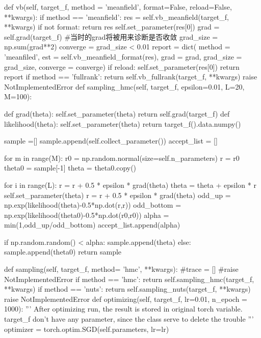 \documentclass{article}
\begin{document}
\begin{python}
    def vb(self, target_f, method = 'meanfield', format=False, 
                 reload=False, **kwargs):
        if method == 'meanfield':
            res = self.vb_meanfield(target_f, **kwargs)
            if not format:
                return res
            self.set_parameter(res[0])
            grad = self.grad(target_f) #当时的grad将被用来诊断是否收敛
            grad_size = np.sum(grad**2)
            converge = grad_size < 0.01
            report = dict( method = 'meanfiled', 
                           est = self.vb_meanfield_format(res),
                           grad = grad,
                           grad_size = grad_size,
                           converge = converge)
            if reload:
                self.set_parameter(res[0])
            return report
        if method == 'fullrank':
            return self.vb_fullrank(target_f, **kwargs)
        raise NotImplementedError
    def sampling_hmc(self, target_f, epsilon=0.01, L=20, M=100):
        
        def grad(theta):
            self.set_parameter(theta)
            return self.grad(target_f)
        def likelihood(theta):
            self.set_parameter(theta)
            return target_f().data.numpy()
        
        sample =[]
        sample.append(self.collect_parameter())
        accept_list = []
        
        for m in range(M):
            r0 = np.random.normal(size=self.n_parameters)
            r = r0
            theta0 = sample[-1]
            theta = theta0.copy()
            
            for i in range(L):
                r = r + 0.5 * epsilon * grad(theta)
                theta = theta + epsilon * r
                self.set_parameter(theta)
                r = r + 0.5 * epsilon * grad(theta)
            odd_up = np.exp(likelihood(theta)-0.5*np.dot(r,r))
            odd_bottom = np.exp(likelihood(theta0)-0.5*np.dot(r0,r0))
            alpha = min(1,odd_up/odd_bottom)
            accept_list.append(alpha)
            
            if np.random.random() < alpha:
                sample.append(theta)
            else:
                sample.append(theta0)
        return sample
        

    def sampling(self, target_f, method= 'hmc', **kwargs):
        #trace = []
        #raise NotImplementedError
        if method == 'hmc':
            return self.sampling_hmc(target_f, **kwargs)
        if method == 'nuts':
            return self.sampling_nuts(target_f, **kwargs)
        raise NotImplementedError
    def optimizing(self, target_f, lr=0.01, n_epoch = 1000):
        '''
        After optimizing run, the result is stored in original torch variable.
        target_f don't have any parameter, since the class serve to delete the trouble
        '''
        optimizer = torch.optim.SGD(self.parameters, lr=lr)
        

\end{python}
\end{document}
